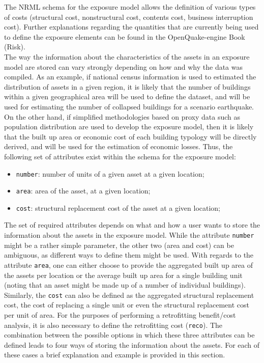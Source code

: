 The NRML schema for the exposure model allows the definition of various types of costs (structural cost, nonstructural cost, contents cost, business interruption cost). Further explanations regarding the quantities that are currently being used to define the exposure elements can be found in the OpenQuake-engine Book (Risk).
\\
The way the information about the characteristics of the \glspl{asset} in an \gls{exposure model} are stored can vary strongly depending on how and why the data was compiled. As an example, if national census information is used to estimated the distribution of assets in a given region, it is likely that the number of buildings within a given geographical area will be used to define the dataset, and will be used for estimating the number of collapsed buildings for a scenario earthquake. On the other hand, if simplified methodologies based on proxy data such as population distribution are used to develop the exposure model, then it is likely that the built up area or economic cost of each building typology will be directly derived, and will be used for the estimation of economic losses. Thus, the following set of attributes exist within the schema for the exposure model:

\begin{itemize}
\item  \Verb+number+: number of units of a given \gls{asset} at a given location;
\item  \Verb+area+: area of the \gls{asset}, at a given location;
\item  \Verb+cost+: structural replacement cost of the \gls{asset} at a given location;
\end{itemize}

The set of required attributes depends on what and how a user wants to store the information about the assets in the exposure model. While the attribute \Verb+number+ might be a rather simple parameter, the other two (area and cost) can be ambiguous, as different ways to define them might be used. With regards to the attribute \Verb+area+, one can either choose to provide the aggregated built up area of the \glspl{asset} per location or the average built up area for a single building unit (noting that an \gls{asset} might be made up of a number of individual buildings). Similarly, the \Verb+cost+ can also be defined as the aggregated structural replacement cost, the cost of replacing a single unit or even the structural replacement cost per unit of area. For the purposes of performing a retrofitting benefit/cost analysis, it is also necessary to define the retrofitting cost (\Verb+reco+). The combination between the possible options in which these three attributes can be defined leads to four ways of storing the information about the assets. For each of these cases a brief explanation and example is provided in this section.

